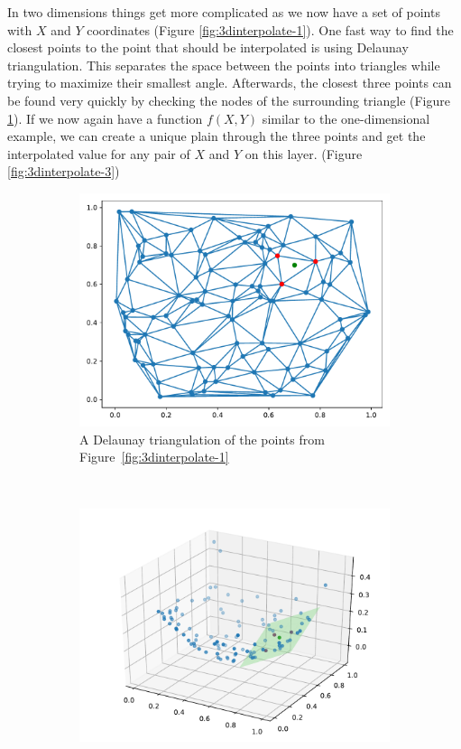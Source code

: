 In two dimensions things get more complicated as we now have a set of points with $X$ and $Y$ coordinates (Figure \ref{fig:3dinterpolate-1}). One fast way to find the closest points to the point that should be interpolated is using Delaunay triangulation. This separates the space between the points into triangles while trying to maximize their smallest angle. Afterwards, the closest three points can be found very quickly by checking the nodes of the surrounding triangle  (Figure \ref{fig:3dinterpolate-2}). If we now again have a function $f(X,Y)$ similar to the one-dimensional example, we can create a unique plain through the three points and get the interpolated value for any pair of $X$ and $Y$ on this layer. (Figure \ref{fig:3dinterpolate-3})


\begin{figure}[] %
	\centering
	\begin{subfigure}[t]{0.48\textwidth}
		\centering
		\includegraphics[width=\linewidth]{images/vis2d2.pdf}
		\caption{A Delaunay triangulation of the points from Figure~\ref{fig:3dinterpolate-1}}
	\label{fig:3dinterpolate-2}
	\end{subfigure}%
	~ 
	\begin{subfigure}[t]{0.48\textwidth}
		\centering
		\includegraphics[width=\linewidth]{images/vis2d3.pdf}

\end{subfigure}
\end{figure}
